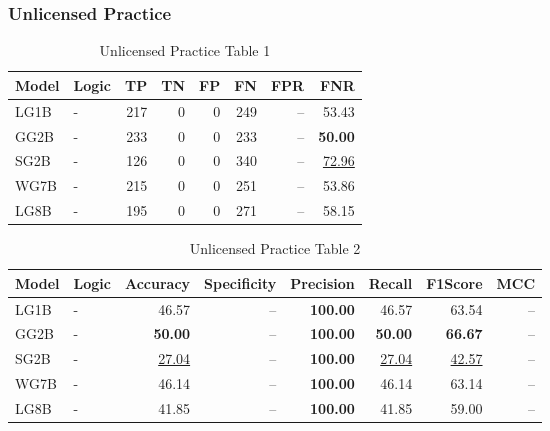 \documentclass{article}
\begin{document}

\subsubsection{Unlicensed Practice}

\begin{table}[H]
\centering
\begin{tabular}{llrrrrrr}
\toprule
 Model          & Logic   &   TP &   TN &   FP &   FN &   FPR &   FNR \\
\midrule

 LG1B    & -       &  217 &    0 &    0 &  249 & --    & 53.43             \\
 GG2B    & -       &  233 &    0 &    0 &  233 & --    & \textbf{50.00}    \\
 SG2B    & -       &  126 &    0 &    0 &  340 & --    & \underline{72.96} \\
 WG7B    & -       &  215 &    0 &    0 &  251 & --    & 53.86             \\
 LG8B    & -       &  195 &    0 &    0 &  271 & --    & 58.15             \\

\bottomrule
\end{tabular}
\caption{\label{tab:widgets}Unlicensed Practice Table 1}
\end{table}

\begin{table}[H]
\begin{tabular}{llrrrrrr}
\toprule
 Model          & Logic   &   Accuracy &   Specificity &   Precision &   Recall &   F1Score &      MCC \\
\midrule

 LG1B    & -       & 46.57             & --            & \textbf{100.00} & 46.57             & 63.54             & --    \\
 GG2B    & -       & \textbf{50.00}    & --            & \textbf{100.00} & \textbf{50.00}    & \textbf{66.67}    & --    \\
 SG2B    & -       & \underline{27.04} & --            & \textbf{100.00} & \underline{27.04} & \underline{42.57} & --    \\
 WG7B    & -       & 46.14             & --            & \textbf{100.00} & 46.14             & 63.14             & --    \\
 LG8B    & -       & 41.85             & --            & \textbf{100.00} & 41.85             & 59.00             & --    \\

\bottomrule
\end{tabular}
\caption{\label{tab:xstest2}Unlicensed Practice Table 2}
\end{table}
\end{document}
